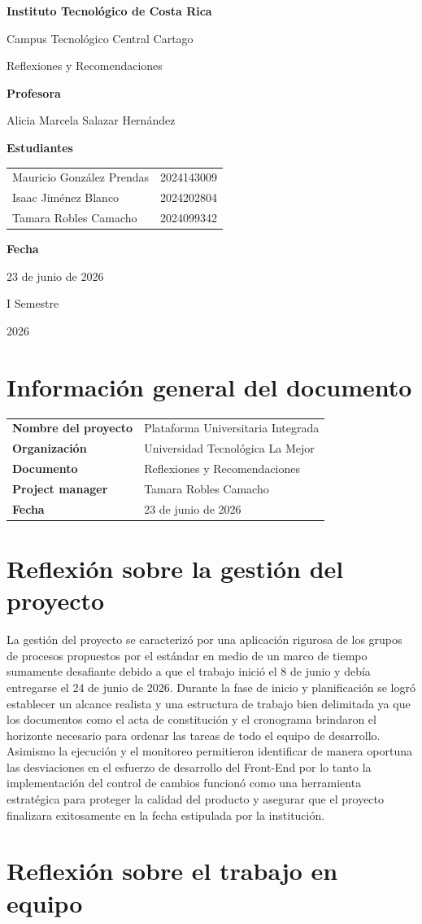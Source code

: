 \documentclass[11pt,spanish]{article}
\title{\DocumentoTitulo}
\author{\AutoresPortada}
\date{\FechaDocumento}
\makeatletter
\newcommand{\Institucion}{Instituto Tecnológico de Costa Rica}
\newcommand{\Campus}{Campus Tecnológico Central Cartago}
\newcommand{\DocumentoTitulo}{Reflexiones y Recomendaciones}
\newcommand{\Profesor}{Alicia Marcela Salazar Hernández}
\newcommand{\FechaDocumento}{23 de junio de 2026}
\newcommand{\PeriodoAcademico}{I Semestre}
\newcommand{\AnioDocumento}{2026}
\newcommand{\AutoresPortada}{%
    \begin{tabular}{l@{\hspace{1.5cm}}r}
        Mauricio González Prendas & 2024143009\\
        Isaac Jiménez Blanco & 2024202804\\
        Tamara Robles Camacho & 2024099342
    \end{tabular}%
}
\newcommand{\MakeCover}{%
\begin{titlepage}
\thispagestyle{empty}
\centering

{\bfseries \huge \Institucion \par}
\vspace{0.25cm}
{\LARGE \Campus \par}

\vfill

{\huge \DocumentoTitulo \par}

\vfill

{\bfseries \LARGE Profesora \par}
{\Large \Profesor \par}

\vfill

{\bfseries \LARGE Estudiantes \par}
{\Large \AutoresPortada \par}

\vfill

{\bfseries\LARGE Fecha \par}
{\Large \FechaDocumento \par}

\vfill

{\LARGE \PeriodoAcademico \par}
{\LARGE \AnioDocumento \par}

\end{titlepage}%
}
\makeatother
\begin{document}
\hypersetup{pageanchor=false}

\MakeCover

\pagestyle{empty}
\tableofcontents
\clearpage
{}
\hypersetup{pageanchor=true}
\pagestyle{fancy}

\section{Información general del documento}

\begin{table}[H]
\centering
\begin{tabularx}{\textwidth}{p{5cm} Y}
\toprule
\textbf{Nombre del proyecto} & Plataforma Universitaria Integrada \\
\textbf{Organización} & Universidad Tecnológica La Mejor \\
\textbf{Documento} & \DocumentoTitulo \\
\textbf{Project manager} & Tamara Robles Camacho \\
\textbf{Fecha} & \FechaDocumento \\
\bottomrule
\end{tabularx}
\end{table}

\section{Reflexión sobre la gestión del proyecto}

La gestión del proyecto se caracterizó por una aplicación rigurosa de los grupos de procesos propuestos por el estándar en medio de un marco de tiempo sumamente desafiante debido a que el trabajo inició el 8 de junio y debía entregarse el 24 de junio de 2026. Durante la fase de inicio y planificación se logró establecer un alcance realista y una estructura de trabajo bien delimitada ya que los documentos como el acta de constitución y el cronograma brindaron el horizonte necesario para ordenar las tareas de todo el equipo de desarrollo. Asimismo la ejecución y el monitoreo permitieron identificar de manera oportuna las desviaciones en el esfuerzo de desarrollo del Front-End por lo tanto la implementación del control de cambios funcionó como una herramienta estratégica para proteger la calidad del producto y asegurar que el proyecto finalizara exitosamente en la fecha estipulada por la institución.

\section{Reflexión sobre el trabajo en equipo}
\end{document}
